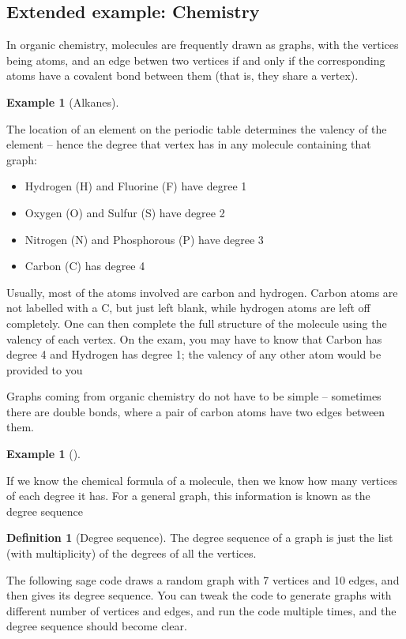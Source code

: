 \documentclass[10pt,]{book}
\theoremstyle{plain}
\theoremstyle{definition}
\newtheorem{definition}[theorem]{Definition}
\theoremstyle{definition}
\theoremstyle{definition}
\newtheorem{example}[theorem]{Example}
\theoremstyle{definition}
\numberwithin{equation}{section}
\begin{document}
\subsection[{Extended example: Chemistry}]{Extended example: Chemistry}\label{subsection-5}
\hypertarget{p-22}{}%
In organic chemistry, molecules are frequently drawn as graphs, with the vertices being atoms, and an edge betwen two vertices if and only if the corresponding atoms have a covalent bond between them (that is, they share a vertex).%
\begin{example}[Alkanes]\label{example-5}
\end{example}
\hypertarget{p-23}{}%
The location of an element on the periodic table determines the valency of the element -- hence the degree that vertex has in any molecule containing that graph:%
\leavevmode%
\begin{itemize}[label=\textbullet]
\item{}Hydrogen (H) and Fluorine (F) have degree 1%
\item{}Oxygen (O) and Sulfur (S) have degree 2%
\item{}Nitrogen (N) and Phosphorous (P) have degree 3%
\item{}Carbon (C) has degree 4%
\end{itemize}
\hypertarget{p-24}{}%
Usually, most of the atoms involved are carbon and hydrogen. Carbon atoms are not labelled with a C, but just left blank, while hydrogen atoms are left off completely. One can then complete the full structure of the molecule using the valency of each vertex.  On the exam, you may have to know that Carbon has degree 4 and Hydrogen has degree 1; the valency of any other atom would be provided to you%
\par
\hypertarget{p-25}{}%
Graphs coming from organic chemistry do not have to be simple – sometimes there are double bonds, where a pair of carbon atoms have two edges between them.%
\begin{example}[]\label{example-6}
\end{example}
\hypertarget{p-26}{}%
If we know the chemical formula of a molecule, then we know how many vertices of each degree it has.  For a general graph, this information is known as the degree sequence%
\begin{definition}[{Degree sequence}]\label{definition-7}
\hypertarget{p-27}{}%
The degree sequence of a graph is just the list (with multiplicity) of the degrees of all the vertices.%
\end{definition}
\hypertarget{p-28}{}%
The following sage code draws a random graph with 7 vertices and 10 edges, and then gives its degree sequence.  You can tweak the code to generate graphs with different number of vertices and edges, and run the code multiple times, and the degree sequence should become clear.%
\end{document}

